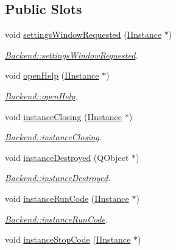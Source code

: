 \subsection*{Public Slots}
\begin{DoxyCompactItemize}
\item 
void \hyperlink{classBackend_a0e96629d0e42a7a77ac25d83efe7b71f}{settings\+Window\+Requested} (\hyperlink{classInstances_1_1IInstance}{I\+Instance} $\ast$)
\begin{DoxyCompactList}\small\item\em \hyperlink{classBackend_a0e96629d0e42a7a77ac25d83efe7b71f}{Backend\+::settings\+Window\+Requested}. \end{DoxyCompactList}\item 
void \hyperlink{classBackend_a4208d788a7fc7ab5fea1e0ea5c349c99}{open\+Help} (\hyperlink{classInstances_1_1IInstance}{I\+Instance} $\ast$)
\begin{DoxyCompactList}\small\item\em \hyperlink{classBackend_a4208d788a7fc7ab5fea1e0ea5c349c99}{Backend\+::open\+Help}. \end{DoxyCompactList}\item 
void \hyperlink{classBackend_a502fcffad9e9435cdc43b7027df6b5a2}{instance\+Closing} (\hyperlink{classInstances_1_1IInstance}{I\+Instance} $\ast$)
\begin{DoxyCompactList}\small\item\em \hyperlink{classBackend_a502fcffad9e9435cdc43b7027df6b5a2}{Backend\+::instance\+Closing}. \end{DoxyCompactList}\item 
void \hyperlink{classBackend_af6c0389fd5ae6d4be1cdf4aa4bcbe2e9}{instance\+Destroyed} (Q\+Object $\ast$)
\begin{DoxyCompactList}\small\item\em \hyperlink{classBackend_af6c0389fd5ae6d4be1cdf4aa4bcbe2e9}{Backend\+::instance\+Destroyed}. \end{DoxyCompactList}\item 
void \hyperlink{classBackend_a18b602a36f6984e5494524be87d8e375}{instance\+Run\+Code} (\hyperlink{classInstances_1_1IInstance}{I\+Instance} $\ast$)
\begin{DoxyCompactList}\small\item\em \hyperlink{classBackend_a18b602a36f6984e5494524be87d8e375}{Backend\+::instance\+Run\+Code}. \end{DoxyCompactList}\item 
void \hyperlink{classBackend_a4baaa487c95ef37472f0ec0aa7b9e682}{instance\+Stop\+Code} (\hyperlink{classInstances_1_1IInstance}{I\+Instance} $\ast$)

\end{DoxyCompactItemize}
